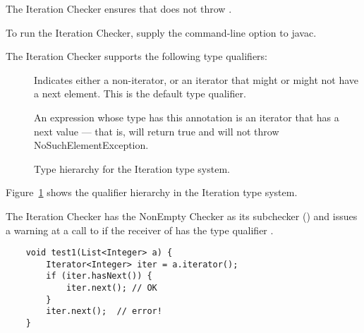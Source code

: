 \htmlhr
{}

The Iteration Checker ensures that
does not throw .

To run the Iteration Checker, supply the
command-line option to javac.

The Iteration Checker supports the following type qualifiers:
\begin{description}

    \item[]
    Indicates either a non-iterator, or an iterator that might or might not have a next element.
    This is the default type qualifier.

    \item[]
    An expression whose type has this annotation is an iterator that has a next value --- that is,
     will return true and
     will not throw NoSuchElementException.

\end{description}

\begin{figure}
    \caption{Type hierarchy for the Iteration type system.}
    \label{fig-iteration-hierarchy}
\end{figure}

Figure~\ref{fig-iteration-hierarchy} shows the qualifier hierarchy in the Iteration type system.


The Iteration Checker has the NonEmpty Checker as its subchecker ()
and issues a warning at a call to  if the receiver of
 has the type qualifier .


\begin{verbatim}
    void test1(List<Integer> a) {
        Iterator<Integer> iter = a.iterator();
        if (iter.hasNext()) {
            iter.next(); // OK
        }
        iter.next();  // error!
    }
\end{verbatim}

